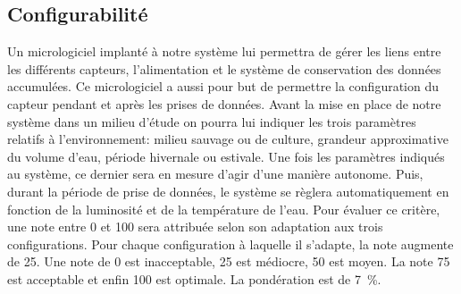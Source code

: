 

\subsection{Configurabilité}
\label{s:cdc_aut_config}

Un micrologiciel implanté à notre système lui permettra de gérer les liens entre les différents capteurs, l’alimentation et le système de conservation des données accumulées.
Ce micrologiciel a aussi pour but de permettre la configuration du capteur pendant et après les prises de données.
Avant la mise en place de notre système dans un milieu d’étude on pourra lui indiquer les trois paramètres relatifs à l’environnement: milieu sauvage ou de culture, grandeur approximative du volume d’eau, période hivernale ou estivale.
Une fois les paramètres indiqués au système, ce dernier sera en mesure d’agir d’une manière autonome.
Puis, durant la période de prise de données, le système se règlera automatiquement en fonction de la luminosité et de la température de l’eau.
\wl
Pour évaluer ce critère, une note entre 0 et 100 sera attribuée selon son adaptation aux trois configurations.
Pour chaque configuration à laquelle il s’adapte, la note augmente de 25.
\wl
Une note de 0 est inacceptable, 25 est médiocre, 50 est moyen.
La note 75 est acceptable et enfin 100 est optimale.
La pondération est de 7~\%.